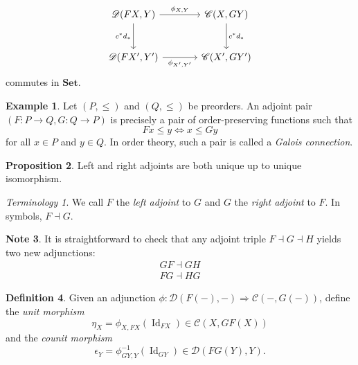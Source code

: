 \documentclass[10pt,letterpaper,cm]{nupset}
\theoremstyle{definition}
\newtheorem{definition}{Definition}[section]
\newtheorem{exmp}[definition]{Example}
\newtheorem{note}[definition]{Note}
\theoremstyle{theorem}
\newtheorem{prop}[definition]{Proposition}
\theoremstyle{remark}
\newtheorem*{term}{Terminology}
\newcommand{\1}{\mathbf{1}}
\renewcommand{\c}{\mathscr{C}}
\renewcommand{\d}{\mathscr{D}}
\newcommand{\0}{\vec 0}
\DeclareMathOperator{\id}{Id}
\begin{document}
\[
\begin{tikzcd}[row sep=large, column sep = large]
\d(F{X}, Y) \arrow[r, "\phi_{X, Y}"] \arrow[d, "c^{\ast}d_{\ast}", swap]
& \c(X, G{Y}) \arrow[d, "c^{\ast}d_{\ast}"] \\
\d(F{X'}, Y')\arrow[r, "\phi_{X', Y'}"']
& \c(X', G{Y'})  
\end{tikzcd}
\] commutes in $\mathbf{Set}$.

\begin{exmp}
Let $\left(P, \leq\right)$ and $\left(Q, \leq\right)$ be preorders. An adjoint pair $\left(F: P \to Q, G: Q \to P\right)$ is precisely a pair of order-preserving functions such that 
\[
F{x} \leq y \iff x \leq G{y}
\] for all $x\in P$ and $y \in Q$. In order theory, such a pair is called a \textit{Galois connection}. 
\end{exmp}

\begin{prop}
Left and right adjoints are both unique up to unique isomorphism.
\end{prop}

\begin{term}
We call $F$ the \textit{left adjoint} to $G$ and $G$ the \textit{right adjoint} to $F$. In symbols, $F \dashv G$.
\end{term}

\begin{note}
It is straightforward to check that any adjoint triple $F \dashv G \dashv H$ yields two new adjunctions:
\begin{gather*}
G{F} \dashv G{H}
\\ F{G} \dashv H{G}
\end{gather*}
\end{note}



\begin{definition}
Given an adjunction $\phi: \d(F(-), -) \Rightarrow \c(-, G(-))$, define the \textit{unit morphism } $$\eta_X =\phi_{X, F{X}}\left(\id_{F{X}}\right) \in \c(X, GF(X))$$ and the \textit{counit morphism} $$\epsilon_Y =\phi_{G{Y}, Y}^{{-1}}\left(\id_{G{Y}}\right) \in \d(FG(Y), Y).$$
\end{definition}
\end{document}
